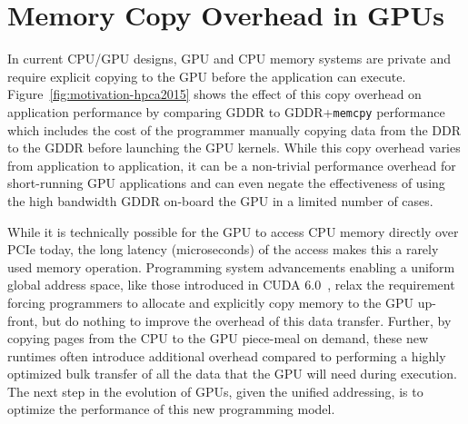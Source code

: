 
\section{Memory Copy Overhead in GPUs}
In current CPU/GPU designs, GPU and CPU memory systems are private and require
explicit copying to the GPU before the application can execute.
Figure~\ref{fig:motivation-hpca2015} shows the effect of this copy overhead on
application performance by comparing GDDR to GDDR+{\tt memcpy} performance which
includes the cost of the programmer manually copying data from the DDR to the
GDDR before launching the GPU kernels.  While this copy overhead varies from
application to application, it can be a non-trivial performance overhead for
short-running GPU applications and can even negate the effectiveness of using
the high bandwidth GDDR on-board the GPU in a limited number of cases.

While it is technically possible for the GPU to access CPU memory directly over
PCIe today, the long latency (microseconds) of the access makes this a rarely
used memory operation.  Programming system advancements enabling a uniform
global address space, like those introduced in CUDA 6.0~\cite{cuda}, relax the
requirement forcing programmers to allocate and explicitly copy memory to the
GPU up-front, but do nothing to improve the overhead of this data transfer.
Further, by copying pages from the CPU to the GPU piece-meal on demand, these
new runtimes often introduce additional overhead compared to performing a highly
optimized bulk transfer of all the data that the GPU will need during execution.
The next step in the evolution of GPUs, given the unified addressing, is to
optimize the performance of this new programming model. 

